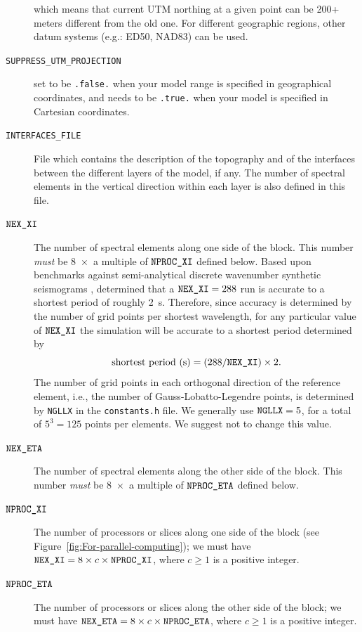 \begin{description}
which means that current UTM northing at a given point can be 200+ meters different from the old one.
For different geographic regions, other datum systems (e.g.: ED50, NAD83) can be used.
\item [{\texttt{SUPPRESS\_UTM\_PROJECTION}}] set to be \texttt{.false.}
when your model range is specified in geographical coordinates, and
needs to be \texttt{.true.} when your model is specified in Cartesian
coordinates. 
\item [{\texttt{INTERFACES\_FILE }}] File which contains the description
of the topography and of the interfaces between the different layers
of the model, if any. The number of spectral elements in the vertical
direction within each layer is also defined in this file.
\item [{$\mbox{\texttt{NEX\_XI\/}}$}] The number of spectral elements along one side of the
block. This number \textit{must} be 8~$\times$~a multiple of $\mbox{\texttt{NPROC\_XI\/}}$
defined below. Based upon benchmarks against semi-analytical discrete
wavenumber synthetic seismograms \citep{KoLiTrSuStSh04}, determined
that a $\mbox{\texttt{NEX\_XI\/}}=288$ run is accurate to a shortest period of roughly
2~s. Therefore, since accuracy is determined by the number of grid
points per shortest wavelength, for any particular value of $\mbox{\texttt{NEX\_XI\/}}$
the simulation will be accurate to a shortest period determined by
\begin{equation}
\mbox{shortest period (s)}=(288/\mbox{\texttt{NEX\_XI\/}})\times2.\label{eq:shortest_period}
\end{equation}
 The number of grid points in each orthogonal direction of the reference
element, i.e., the number of Gauss-Lobatto-Legendre points, is determined
by \texttt{NGLLX} in the \texttt{constants.h} file. We generally use
$\mbox{\texttt{NGLLX\/}}=5$, for a total of $5^{3}=125$ points per
elements. We suggest not to change this value.
\item [{$\mbox{\texttt{NEX\_ETA\/}}$}] The number of spectral elements along the other side
of the block. This number \textit{must} be 8~$\times$~a multiple
of $\mbox{\texttt{NPROC\_ETA\/}}$ defined below.
\item [{$\mbox{\texttt{NPROC\_XI\/}}$}] The number of processors or slices along one side
of the block (see Figure~\ref{fig:For-parallel-computing}); we must
have $\mbox{\texttt{NEX\_XI\/}}=8\times c\times\mbox{\texttt{NPROC\_XI\/}}$, where $c\ge1$ is a positive
integer.
\item [{$\mbox{\texttt{NPROC\_ETA\/}}$}] The number of processors or slices along the other
side of the block; we must have $\mbox{\texttt{NEX\_ETA\/}}=8\times c\times\mbox{\texttt{NPROC\_ETA\/}}$,
where $c\ge1$ is a positive integer.

\end{description}
